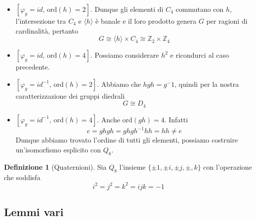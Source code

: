 \documentclass[a4paper]{article}
\theoremstyle{remark}
\theoremstyle{definition}
\newtheorem{definition}[theorem]{Definizione}
\begin{document}
\begin{multicols}{2}
\begin{itemize}
	\item $ \left[\varphi_g =  id, \, \text{ord}(h) =2\right] $. Dunque gli elementi di $ C_4 $ commutano con $ h $, l'intersezione tra $ C_4 $ e $ \langle h \rangle $ è banale e il loro prodotto genera $ G $ per ragioni di cardinalità, pertanto \[ G \cong  \langle h \rangle\times C_4  \cong  \mathbb{Z}_2\times\mathbb{Z}_4 \]
	\item $ \left[\varphi_g =  id, \, \text{ord}(h) =4\right] $. Possiamo considerare $ h^2 $ e ricondurci al caso precedente.
	\item $ \left[\varphi_g =  id^{-1}, \, \text{ord}(h) =2\right] $. Abbiamo che $ hgh = g^-1 $, quindi per la nostra caratterizzazione dei gruppi diedrali \[ G \cong D_4 \]
	\item $ \left[\varphi_g =  id^{-1}, \, \text{ord}(h) =4\right] $. Anche ord$ (gh) = 4 $. Infatti
	\[ e = ghgh = ghgh^{-1}hh = hh \neq e \]
	Dunque abbiamo trovato l'ordine di tutti gli elementi, possiamo costruire un'isomorfismo esplicito con $ Q_8 $.
\end{itemize}
\begin{definition}[Quaternioni]
	Sia $ Q_8 $ l'insieme $ \{ \pm 1, \pm i, \pm j, \pm, k \} $ con l'operazione che soddisfa
	\[ i^2 = j^2 = k^2 = ijk = -1 \]
\end{definition}
\end{multicols}

\subsection{Lemmi vari}
\end{document}
